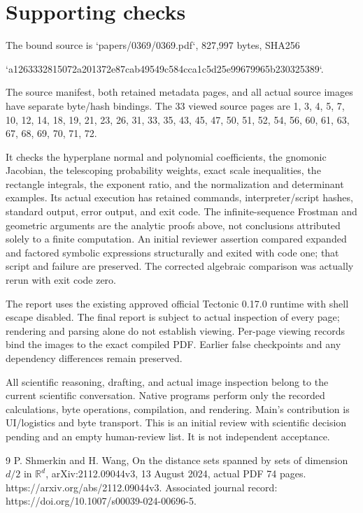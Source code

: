 \documentclass[10pt]{article}
\begin{document}
\section*{Supporting checks}
The bound source is `papers/0369/0369.pdf`, 827,997 bytes, SHA256\par
`a1263332815072a201372e87cab49549c584cca1c5d25e99679965b230325389`.\par
The source manifest, both retained metadata pages, and all actual source images have separate byte/hash bindings. The 33 viewed source pages are 1, 3, 4, 5, 7, 10, 12, 14, 18, 19, 21, 23, 26, 31, 33, 35, 43, 45, 47, 50, 51, 52, 54, 56, 60, 61, 63, 67, 68, 69, 70, 71, 72.\par
It checks the hyperplane normal and polynomial coefficients, the gnomonic Jacobian, the telescoping probability weights, exact scale inequalities, the rectangle integrals, the exponent ratio, and the normalization and determinant examples. Its actual execution has retained commands, interpreter/script hashes, standard output, error output, and exit code. The infinite-sequence Frostman and geometric arguments are the analytic proofs above, not conclusions attributed solely to a finite computation. An initial reviewer assertion compared expanded and factored symbolic expressions structurally and exited with code one; that script and failure are preserved. The corrected algebraic comparison was actually rerun with exit code zero.\par
The report uses the existing approved official Tectonic 0.17.0 runtime with shell escape disabled. The final report is subject to actual inspection of every page; rendering and parsing alone do not establish viewing. Per-page viewing records bind the images to the exact compiled PDF. Earlier false checkpoints and any dependency differences remain preserved.\par
All scientific reasoning, drafting, and actual image inspection belong to the current scientific conversation. Native programs perform only the recorded calculations, byte operations, compilation, and rendering. Main’s contribution is UI/logistics and byte transport. This is an initial review with scientific decision pending and an empty human-review list. It is not independent acceptance.\par
9 P. Shmerkin and H. Wang, On the distance sets spanned by sets
of dimension \(d/2\) in \(\mathbb R^d\), arXiv:2112.09044v3, 13 August 2024, actual PDF 74 pages. https://arxiv.org/abs/2112.09044v3. Associated journal record: https://doi.org/10.1007/s00039-024-00696-5.\par
\end{document}
